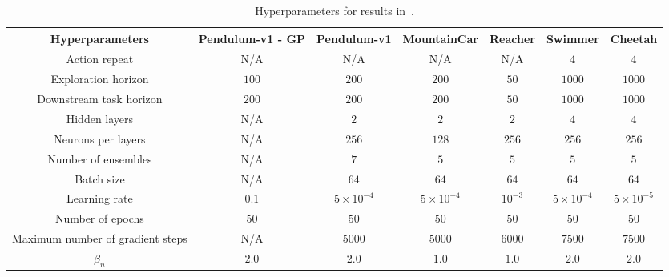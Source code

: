 \begin{table}[ht]
\centering
    \caption{Hyperparameters for results in~.}
    \label{tab:environment_hyperparams}
\begin{adjustbox}{max width=\linewidth}\begin{threeparttable}
\begin{tabular}{ccccccc}
\midrule
\textbf{Hyperparameters}         & \textbf{Pendulum-v1 - GP} & \textbf{Pendulum-v1} & \textbf{MountainCar} & \textbf{Reacher} & \textbf{Swimmer} & \textbf{Cheetah} \\
\midrule
Action repeat           & N/A              & N/A         & N/A         & N/A     & 4       & 4       \\
Exploration horizon     & $100$              & $200$         & $200$         & $50$      & $1000$    & $1000$    \\
Downstream task horizon & $200$              & $200$         & $200$         & $50$      & $1000$    & $1000$    \\
Hidden layers           & N/A              & $2$           & $2$           & $2$       & $4$       & $4$       \\
Neurons per layers      & N/A              & $256$         & $128$         & $256$     & $256$     & $256$     \\
Number of ensembles     & N/A              & $7$           & $5$           & $5$       & $5$       & $5$       \\
Batch size              & N/A              & $64$          & $64$          & $64$      & $64$      & $64$      \\
Learning rate           & $0.1$              & $5 \times 10^{-4}$        & $5 \times 10^{-4}$        & $10^{-3}$     & $5 \times 10^{-4}$     & $5 \times 10^{-5}$     \\
Number of epochs        & $50$               & $50$          & $50$          & $50$      & $50$      & $50$      \\
Maximum number of gradient steps     & N/A              & $5000$        & $5000$        & $6000$    & $7500$    & $7500$    \\
$\beta_n$                    & $2.0$              & $2.0$        & $1.0$         & $1.0$     & $2.0$     & $2.0$ \\
\bottomrule
\end{tabular}
\end{threeparttable}\end{adjustbox}
\end{table}
